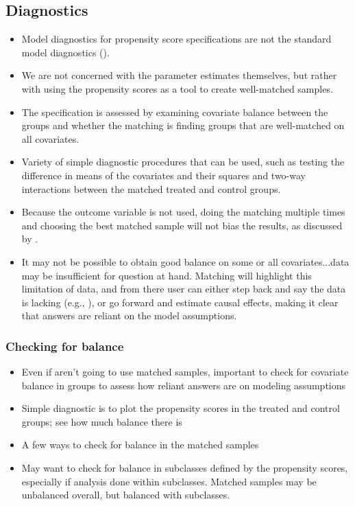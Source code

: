 \documentclass[11pt,titlepage]{article}
\begin{document}
\subsection{Diagnostics}
\begin{itemize}
\item Model diagnostics for propensity score specifications are not
  the standard model diagnostics (\cite{Rubin04}).
\item We are not concerned with the parameter estimates themselves,
  but rather with using the propensity scores as a tool to create
  well-matched samples.
\item The specification is assessed by examining covariate balance
  between the groups and whether the matching is finding groups that
  are well-matched on all covariates.
\item Variety of simple diagnostic procedures that can be used, such
  as testing the difference in means of the covariates and their
  squares and two-way interactions between the matched treated and
  control groups.
\item Because the outcome variable is not used, doing the matching
  multiple times and choosing the best matched sample will not bias
  the results, as discussed by \cite{Greevy04}.
\item It may not be possible to obtain good balance on some or all
  covariates...data may be insufficient for question at hand.
  Matching will highlight this limitation of data, and from there user
  can either step back and say the data is lacking (e.g.,
  \cite{Rubin01, AgoDyn04}), or go forward and estimate causal
  effects, making it clear that answers are reliant on the model
  assumptions.
\end{itemize}

\subsubsection{Checking for balance}
\begin{itemize}
\item Even if aren't going to use matched samples, important to check
  for covariate balance in groups to assess how reliant answers are on
  modeling assumptions
\item Simple diagnostic is to plot the propensity scores in the
  treated and control groups; see how much balance there is
\item A few ways to check for balance in the matched samples
\item May want to check for balance in subclasses defined by the
  propensity scores, especially if analysis done within subclasses.
  Matched samples may be unbalanced overall, but balanced with
  subclasses.
\end{itemize}
\end{document}
